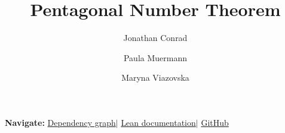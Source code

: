 \documentclass{article}
\title{Pentagonal Number Theorem}
\author{Jonathan Conrad \and Paula Muermann \and Maryna Viazovska}
\begin{document}
\maketitle

\begin{center}
\textbf{Navigate:}\quad
\href{dep_graph_document.html}{Dependency graph}\quad$|$\quad
\href{https://viazovska.github.io/PentagonalNumberTheorem/docs}{Lean documentation}\quad$|$\quad
\href{https://github.com/viazovska/PentagonalNumberTheorem}{GitHub}
\end{center}



\end{document}
